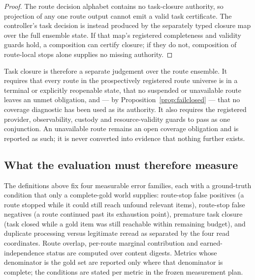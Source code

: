 \begin{proof}
The route decision alphabet contains no task-closure authority, so projection
of any one route output cannot emit a valid task certificate. The controller's
task decision is instead produced by the separately typed closure map over the
full ensemble state. If that map's registered completeness and validity guards
hold, a composition can certify closure; if they do not, composition of
route-local stops alone supplies no missing authority.
\end{proof}

Task closure is therefore a separate judgement over the route ensemble. It
requires that every route in the prospectively registered route universe is in
a terminal or explicitly reopenable state, that
no suspended or unavailable route leaves an unmet obligation, and --- by
Proposition~\ref{prop:failclosed} --- that no coverage diagnostic has been used
as its authority. It also requires the registered provider, observability,
custody and resource-validity guards to pass as one conjunction. An unavailable
route remains an open coverage obligation and
is reported as such; it is never converted into evidence that nothing further
exists.

\subsection{What the evaluation must therefore measure}

The definitions above fix four measurable error families, each with a
ground-truth condition that only a complete-gold world supplies: route-stop
false positives (a route stopped while it could still reach unfound relevant
items), route-stop false negatives (a route continued past its exhaustion
point), premature task closure (task closed while a gold item was still
reachable within remaining budget), and duplicate processing versus legitimate
reread as separated by the four read coordinates. Route overlap, per-route
marginal contribution and earned-independence status are computed over content
digests. Metrics whose denominator is the gold set are reported only where that
denominator is complete; the conditions are stated per metric in the frozen
measurement plan.

